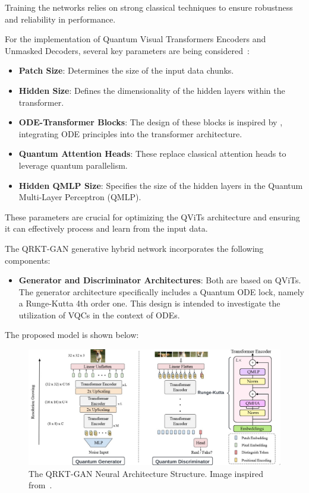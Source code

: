 \documentclass[12pt,a4paper]{report}
\begin{document}
Training the networks relies on strong classical techniques to ensure robustness and reliability in performance.

For the implementation of Quantum Visual Transformers Encoders and Unmasked Decoders, several key parameters are being considered~\cite{Comajoan_Cara_2024}:

\begin{itemize}
  \item \textbf{Patch Size}: Determines the size of the input data chunks.
  \item \textbf{Hidden Size}: Defines the dimensionality of the hidden layers within the transformer.
  \item \textbf{ODE-Transformer Blocks}: The design of these blocks is inspired by \cite{li2022ode}, integrating ODE principles into the transformer architecture.
  \item \textbf{Quantum Attention Heads}: These replace classical attention heads to leverage quantum parallelism.
  \item \textbf{Hidden QMLP Size}: Specifies the size of the hidden layers in the Quantum Multi-Layer Perceptron (QMLP).
\end{itemize}

These parameters are crucial for optimizing the QViTs architecture and ensuring it can effectively process and learn from the input data.

The QRKT-GAN generative hybrid network incorporates the following components:

\begin{itemize}
  \item \textbf{Generator and Discriminator Architectures}: Both are based on QViTs. The generator architecture specifically includes a  Quantum ODE lock, namely a Runge-Kutta 4th order one. This design is intended to investigate the utilization of VQCs in the context of ODEs.
\end{itemize}

The proposed model is shown below:

\begin{figure}[th]
  \centering
  \includegraphics[scale=0.193]{./pics/Blank diagram - Page 1 (2).png}
  \caption[The QRKT-GAN Neural Architecture Structure]{The QRKT-GAN Neural Architecture Structure. Image inspired from~\cite{Comajoan_Cara_2024, jiang2021transgan}.}
  \label{fig:p11}
\end{figure}
\end{document}
